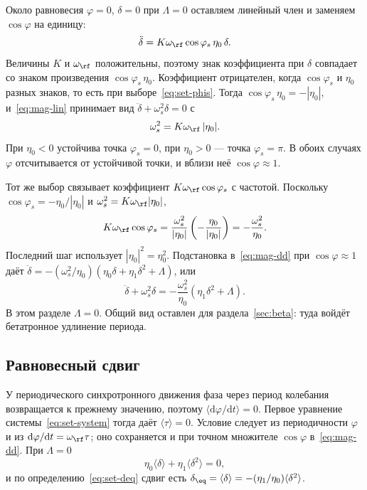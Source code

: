 Около равновесия $\varphi=0$, $\delta=0$ при $\Lambda=0$ оставляем линейный член и заменяем $\cos\varphi$ на единицу:
\begin{equation}
\label{eq:mag-lin}
\ddot\delta=K\omega_\rf\cos\varphi_s\,\eta_0\,\delta.
\end{equation}
Величины $K$ и $\omega_\rf$ положительны, поэтому знак коэффициента при $\delta$ совпадает со знаком произведения $\cos\varphi_s\,\eta_0$. Коэффициент отрицателен, когда $\cos\varphi_s$ и $\eta_0$ разных знаков, то есть при выборе~\eqref{eq:set-phis}. Тогда $\cos\varphi_s\,\eta_0=-|\eta_0|$, и~\eqref{eq:mag-lin} принимает вид $\ddot\delta+\omega_s^2\delta=0$ с
\begin{equation}
\label{eq:mag-ws}
\omega_s^2=K\omega_\rf\,|\eta_0|.
\end{equation}
При $\eta_0<0$ устойчива точка $\varphi_s=0$, при $\eta_0>0$ --- точка $\varphi_s=\pi$. В обоих случаях $\varphi$ отсчитывается от устойчивой точки, и вблизи неё $\cos\varphi\approx 1$.

Тот же выбор связывает коэффициент $K\omega_\rf\cos\varphi_s$ с частотой. Поскольку $\cos\varphi_s=-\eta_0/|\eta_0|$ и $\omega_s^2=K\omega_\rf|\eta_0|$,
\begin{equation}
\label{eq:mag-Kcos}
K\omega_\rf\cos\varphi_s
=\frac{\omega_s^2}{|\eta_0|}
\left(-\frac{\eta_0}{|\eta_0|}\right)
=-\frac{\omega_s^2}{\eta_0}.
\end{equation}
Последний шаг использует $|\eta_0|^2=\eta_0^2$. Подстановка в~\eqref{eq:mag-dd} при $\cos\varphi\approx 1$ даёт
$\ddot\delta=-(\omega_s^2/\eta_0)(\eta_0\delta+\eta_1\delta^2+\Lambda)$, или
\begin{equation}
\label{eq:mag-osc}
\ddot\delta+\omega_s^2\delta
=-\frac{\omega_s^2}{\eta_0}(\eta_1\delta^2+\Lambda).
\end{equation}
В этом разделе $\Lambda=0$. Общий вид оставлен для раздела~\ref{sec:beta}: туда войдёт бетатронное удлинение периода.

\subsection{Равновесный сдвиг}

У периодического синхротронного движения фаза через период колебания возвращается к прежнему значению, поэтому $\langle\mathrm{d}\varphi/\mathrm{d}t\rangle=0$. Первое уравнение системы~\eqref{eq:set-system} тогда даёт $\langle\tau\rangle=0$. Условие следует из периодичности $\varphi$ и из $\mathrm{d}\varphi/\mathrm{d}t=\omega_\rf\tau$; оно сохраняется и при точном множителе $\cos\varphi$ в~\eqref{eq:mag-dd}. При $\Lambda=0$
\begin{equation}
\label{eq:mag-mean}
\eta_0\langle\delta\rangle+\eta_1\langle\delta^2\rangle=0,
\end{equation}
и по определению~\eqref{eq:set-deq} сдвиг есть $\delta_\eq=\langle\delta\rangle=-(\eta_1/\eta_0)\langle\delta^2\rangle$.


